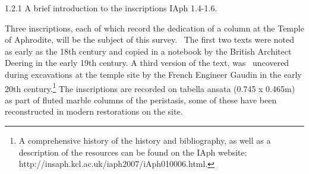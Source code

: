 \documentclass[amsthm,ebook]{saparticle}
\begin{document}
\bigskip

1.2.1 A brief introduction to the inscriptions IAph 1.4-1.6.


\bigskip

Three inscriptions, each of which record the dedication of a column at the Temple of Aphrodite, will be the subject of
this survey. \ The first two texts were noted as early as the 18th century and copied in a notebook by the British
Architect Deering in the early 19th century. A third version of the text, was \ uncovered during excavations at the
temple site by the French Engineer Gaudin in the early 20th century.\footnote{ A comprehensive history of the history
and bibliography, as well as a description of the resources can be found on the IAph website:
http://insaph.kcl.ac.uk/iaph2007/iAph010006.html. } The inscriptions are recorded on tabella ansata (0.745 x 0.465m) as
part of fluted marble columns of the peristasis, some of these have been reconstructed in modern restorations on the
site. 


\bigskip
\end{document}
